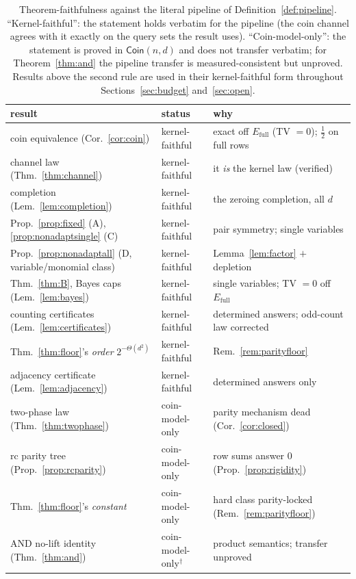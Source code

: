 \documentclass[11pt]{article}
\theoremstyle{definition}
\theoremstyle{remark}
\begin{document}
\begin{table}[t]
\centering
\footnotesize
\begin{tabular}{lll}
\hline
result & status & why\\
\hline
coin equivalence (Cor.~\ref{cor:coin}) & kernel-faithful & exact off
$E_{\mathrm{full}}$ (TV $=0$); $\tfrac12$ on full rows\\
channel law (Thm.~\ref{thm:channel}) & kernel-faithful & it \emph{is} the
kernel law (verified)\\
completion (Lem.~\ref{lem:completion}) & kernel-faithful & the zeroing
completion, all $d$\\
Prop.~\ref{prop:fixed} (A), \ref{prop:nonadaptsingle} (C) & kernel-faithful &
pair symmetry; single variables\\
Prop.~\ref{prop:nonadaptall} (D, variable/monomial class) & kernel-faithful &
Lemma~\ref{lem:factor} $+$ depletion\\
Thm.~\ref{thm:B}, Bayes caps (Lem.~\ref{lem:bayes}) & kernel-faithful &
single variables; TV $=0$ off $E_{\mathrm{full}}$\\
counting certificates (Lem.~\ref{lem:certificates}) & kernel-faithful &
determined answers; odd-count law corrected\\
Thm.~\ref{thm:floor}'s \emph{order} $2^{-\Theta(d^2)}$ & kernel-faithful &
Rem.~\ref{rem:parityfloor}\\
adjacency certificate (Lem.~\ref{lem:adjacency}) & kernel-faithful &
determined answers only\\
\hline
two-phase law (Thm.~\ref{thm:twophase}) & coin-model-only & parity mechanism
dead (Cor.~\ref{cor:closed})\\
rc parity tree (Prop.~\ref{prop:rcparity}) & coin-model-only & row sums answer
$0$ (Prop.~\ref{prop:rigidity})\\
Thm.~\ref{thm:floor}'s \emph{constant} & coin-model-only & hard class
parity-locked (Rem.~\ref{rem:parityfloor})\\
AND no-lift identity (Thm.~\ref{thm:and}) & coin-model-only$^{\dagger}$ &
product semantics; transfer unproved\\
\hline
\end{tabular}
\caption{Theorem-faithfulness against the literal pipeline of
Definition~\ref{def:pipeline}.  ``Kernel-faithful'': the statement holds
verbatim for the pipeline (the coin channel agrees with it exactly on the
query sets the result uses).  ``Coin-model-only'': the statement is proved
in $\mathsf{Coin}(n,d)$ and does not transfer verbatim; for
Theorem~\ref{thm:and} the pipeline transfer is measured-consistent but
unproved.  Results above the second rule are used in their
kernel-faithful form throughout Sections~\ref{sec:budget}
and~\ref{sec:open}.}
\label{tab:faithfulness}
\end{table}
\end{document}
